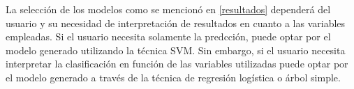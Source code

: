 La selección de los modelos como se mencionó en \ref{resultados}  dependerá del usuario y su necesidad de interpretación de resultados en cuanto a las variables empleadas. Si el usuario necesita solamente la predcción, puede optar por el modelo generado utilizando la técnica SVM. Sin embargo, si el usuario necesita interpretar la clasificación en función de las variables utilizadas puede optar por el modelo generado a través de la técnica de regresión logística o árbol simple.

